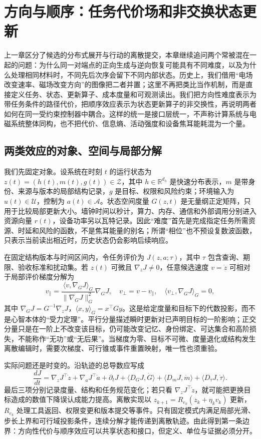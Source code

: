 \chapter{方向与顺序：任务代价场和非交换状态更新}
\label{chap:cognitive_electrodynamics}

上一章区分了候选的分布式展开与行动的离散提交，本章继续追问两个常被混在一起的问题：为什么同一对端点的正向生成与逆向恢复可能具有不同难度，以及为什么处理相同材料时，不同先后次序会留下不同内部状态。历史上，我们借用“电场改变速率、磁场改变方向”的图像把二者并置；这里不再把类比当作机制，而是直接定义任务、状态、更新算子、成本度量和可观测读出。我们把方向性难度表示为带任务条件的路径代价，把顺序效应表示为状态更新算子的非交换性，再说明两者如何在同一受约束控制器中耦合。这样的统一是接口层统一，不声称计算系统与电磁系统整体同构，也不把代价、信息熵、活动强度和设备焦耳能耗混为一个量。

\section{两类效应的对象、空间与局部分解}
\label{sec:section_519}

我们先固定对象。设系统在时刻 $t$ 的运行状态为 $z(t)=(h(t),m(t),g(t))\in\mathcal Z$，其中 $h\in\mathbb R^{d_h}$ 是快速分布表示，$m$ 是带身份、来源与版本的局部结构记录，$g$ 是目标、权限和风险约束；环境输入为 $u(t)\in\mathcal U$，控制为 $a(t)\in\mathcal A$。状态空间度量 $G(z,t)$ 是无量纲正定矩阵，只用于比较局部更新大小。墙钟时间以秒计，算力、内存、通信和外部调用分别进入资源向量 $r(t)$，设备功率另以瓦特记录。因此“难度”首先是完成指定任务所需资源、时延和风险的函数，不是焦耳能量的别名；所谓“相位”也不预设复数波函数，只表示当前读出相近时，历史状态仍会影响后续响应。

在固定结构版本与时间区间内，令任务评价为 $J(z,a;\tau)$，其中 $\tau$ 包含查询、期限、验收标准和扰动集。若 $z(t)$ 可微且 $\nabla_zJ\neq0$，任意候选速度 $v=\dot z$ 可相对于局部评价梯度分解为
\[
v_{\parallel}=\frac{\langle v,\nabla_GJ\rangle_G}{\|\nabla_GJ\|_G^2}\nabla_GJ,
\quad v_{\perp}=v-v_{\parallel},
\quad \langle v_{\perp},\nabla_GJ\rangle_G=0,
\]
其中 $\nabla_GJ=G^{-1}\nabla_zJ$，$\langle x,y\rangle_G=x^\top Gy$。这是给定度量和目标下的代数投影，而不是心智本体的“受力定理”。平行分量描述瞬时更新对已声明目标的一阶影响；正交分量只是在一阶上不改变该目标，仍可能改变记忆、身份绑定、可达集合和高阶损失，不能称作“无功”或“无后果”。当梯度为零、目标不可微、度量退化或结构发生离散编辑时，需要次梯度、可行锥或事件重置映射，唯一性也须重验。

实际问题还是时变的。沿轨迹的总导数应写成
\[
\frac{dJ}{dt}=\nabla_zJ^\top\dot z+\nabla_aJ^\top\dot a+\partial_tJ
+\langle D_GJ,\dot G\rangle+\langle D_mJ,\dot m\rangle
+\langle D_\tau J,\dot\tau\rangle .
\]
最后三项分别记录度量、结构和任务规范变化；若只看 $\nabla_zJ^\top\dot z$，就可能把更换目标造成的数值下降误认成能力提高。离散实现以 $z_{k+1}=R_{e_k}(z_k+\eta_kv_k)$ 更新，$R_{e_k}$ 处理工具返回、权限变更和版本提交等事件。只有固定模式内满足局部光滑、步长上界和可行域投影条件，连续分解才能传递到离散轨迹。由此得到第一条边界：方向性代价与顺序效应可以共享状态和接口，但定义、单位与证据必须分开。

